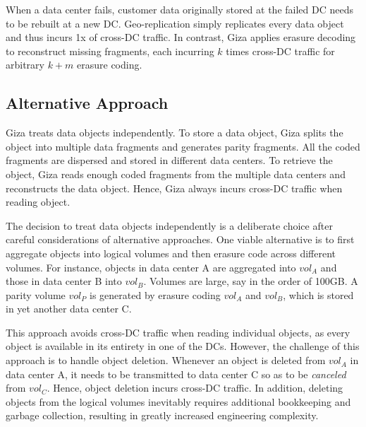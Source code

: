 When a data center fails, customer data originally stored at the failed DC needs to be rebuilt at a new DC. Geo-replication simply replicates every data object and thus incurs 1x of cross-DC traffic. In contrast, Giza applies erasure decoding to reconstruct missing fragments, each incurring $k$ times cross-DC traffic for arbitrary $k+m$ erasure coding.

\subsection{Alternative Approach}
\label{sec:alternative}


Giza treats data objects independently. To store a data object, Giza splits the object into multiple data fragments and generates parity fragments. All the coded fragments are dispersed and stored in different data centers. To retrieve the object, Giza reads enough coded fragments from the multiple data centers and reconstructs the data object. Hence, Giza always incurs cross-DC traffic when reading object.

The decision to treat data objects independently is a deliberate choice after careful considerations of alternative approaches. One viable alternative is to first aggregate objects into logical volumes and then erasure code across different volumes. For instance, objects in data center A are aggregated into $vol_A$ and those in data center B into $vol_B$. Volumes are large, say in the order of 100GB. A parity volume $vol_P$ is generated by erasure coding $vol_A$ and $vol_B$, which is stored in yet another data center C.

This approach avoids cross-DC traffic when reading individual objects, as every object is available in its entirety in one of the DCs. However, the challenge of this approach is to handle object deletion. Whenever an object is deleted from $vol_A$ in data center A, it needs to be transmitted to data center C so as to be {\em canceled} from $vol_C$. Hence, object deletion incurs cross-DC traffic. In addition, deleting objects from the logical volumes inevitably requires additional bookkeeping and garbage collection, resulting in greatly increased engineering complexity.


